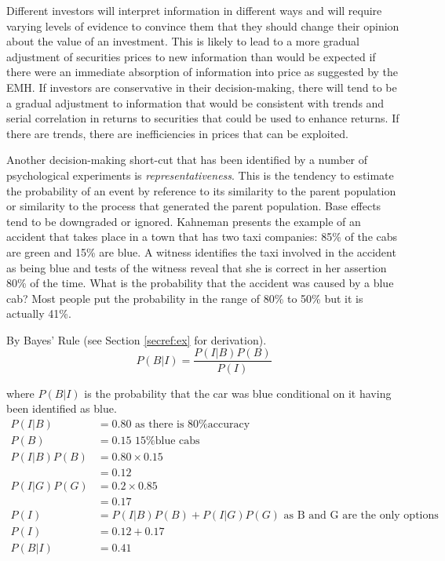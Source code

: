 \documentclass[12pt, a4paper, oneside]{article} %
\begin{document}
Different investors will interpret information in different ways and will require varying levels of evidence to convince them that they should change their opinion about the value of an investment.  This is likely to lead to a more gradual adjustment of securities prices to new information than would be expected if there were an immediate absorption of information into price as suggested by the EMH.  If investors are conservative in their decision-making, there will tend to be a gradual adjustment to information that would be consistent with trends and serial correlation in returns to securities that could be used to enhance returns.  If there are trends, there are inefficiencies in prices that can be exploited. 

Another decision-making short-cut that has been identified by a number of psychological experiments is \emph{representativeness}.  This is the tendency to estimate the probability of an event by reference to its similarity to the parent population or similarity to the process that generated the parent population.  Base effects tend to be downgraded or ignored.  Kahneman presents the example of an accident that takes place in a town that has two taxi companies: 85\% of the cabs are green and 15\% are blue.  A witness identifies the taxi involved in the accident as being blue and tests of the witness reveal that she is correct in her assertion 80\% of the time.  What is the probability that the accident was caused by a blue cab?  Most people put the probability in the range of 80\% to 50\% but it is actually 41\%. 

By Bayes' Rule (see Section \ref{secref:ex} for derivation). 
\begin{equation}
P(B|I) = \frac{P(I|B)P(B)}{P(I)}
\end{equation}

where $P(B|I)$ is the probability that the car was blue conditional on it having been identified as blue.  
\begin{align*}
P(I|B) &= 0.80 \text{   as there is 80\% accuracy}\\
P(B) & = 0.15 \text{   15\% blue cabs}\\
P(I|B)P(B) & = 0.80 \times 0.15\\
 &= 0.12\\
P(I|G)P(G) &= 0.2 \times 0.85 \\
&=0.17\\
P(I)&= P(I|B)P(B) + P(I|G)P(G) \text{   as B and G are the only options}\\
P(I) &= 0.12 + 0.17\\
P(B|I) &=0.41\\
\end{align*}
\citep{KahnemanCabs}
  
\end{document}
